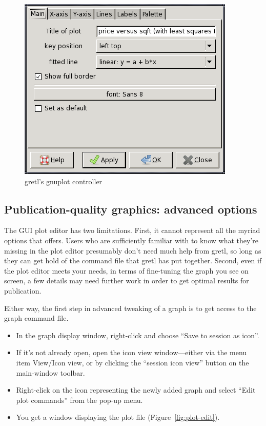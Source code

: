 \begin{figure}[htbp]
  \begin{center}
    \includegraphics[scale=0.6]{figures/plot_control}
  \end{center}
  \caption{gretl's gnuplot controller}
  \label{fig-plot}
\end{figure}


\subsection{Publication-quality graphics: advanced options}
\label{plot-advanced}

The GUI plot editor has two limitations.  First, it cannot represent
all the myriad options that  offers. Users who are
sufficiently familiar with  to know what they're missing
in the plot editor presumably don't need much help from gretl,
so long as they can get hold of the  command file that
gretl has put together.  Second, even if the plot editor meets
your needs, in terms of fine-tuning the graph you see on screen, a few
details may need further work in order to get optimal results for
publication.

Either way, the first step in advanced tweaking of a graph is to get
access to the graph command file.

\begin{itemize}
\item In the graph display window, right-click and choose ``Save to
  session as icon''.
\item If it's not already open, open the icon view window---either
  via the menu item View/Icon view, or by clicking the ``session icon
  view'' button on the main-window toolbar.
\item Right-click on the icon representing the newly added graph and
  select ``Edit plot commands'' from the pop-up menu.
\item You get a window displaying the plot file
  (Figure~\ref{fig:plot-edit}).
\end{itemize}

